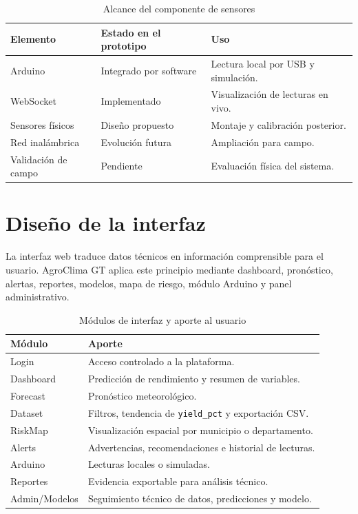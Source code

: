 \documentclass[12pt,letterpaper,oneside]{report}
\newcommand{\codigo}[1]{\texttt{#1}}
\begin{document}
\begin{table}[H]
\centering
\caption{Alcance del componente de sensores}
\begin{tabularx}{\textwidth}{p{3cm}p{4cm}X}
\toprule
\textbf{Elemento} & \textbf{Estado en el prototipo} & \textbf{Uso} \\
\midrule
Arduino & Integrado por software & Lectura local por USB y simulación. \\
WebSocket & Implementado & Visualización de lecturas en vivo. \\
Sensores físicos & Diseño propuesto & Montaje y calibración posterior. \\
Red inalámbrica & Evolución futura & Ampliación para campo. \\
Validación de campo & Pendiente & Evaluación física del sistema. \\
\bottomrule
\end{tabularx}
\end{table}

\section{Diseño de la interfaz}
La interfaz web traduce datos técnicos en información comprensible para el usuario. AgroClima GT aplica este principio mediante dashboard, pronóstico, alertas, reportes, modelos, mapa de riesgo, módulo Arduino y panel administrativo.

\begin{table}[H]
\centering
\caption{Módulos de interfaz y aporte al usuario}
\begin{tabularx}{\textwidth}{p{3cm}X}
\toprule
\textbf{Módulo} & \textbf{Aporte} \\
\midrule
Login & Acceso controlado a la plataforma. \\
Dashboard & Predicción de rendimiento y resumen de variables. \\
Forecast & Pronóstico meteorológico. \\
Dataset & Filtros, tendencia de \codigo{yield\_pct} y exportación CSV. \\
RiskMap & Visualización espacial por municipio o departamento. \\
Alerts & Advertencias, recomendaciones e historial de lecturas. \\
Arduino & Lecturas locales o simuladas. \\
Reportes & Evidencia exportable para análisis técnico. \\
Admin/Modelos & Seguimiento técnico de datos, predicciones y modelo. \\
\bottomrule
\end{tabularx}
\end{table}
\end{document}
